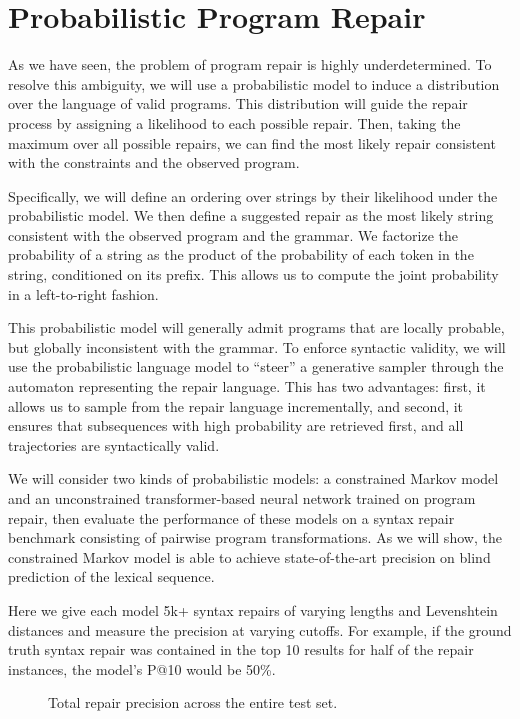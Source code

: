 \chapter{\rm\bfseries Probabilistic Program Repair}
\label{ch:chapter03}

As we have seen, the problem of program repair is highly underdetermined. To resolve this ambiguity, we will use a probabilistic model to induce a distribution over the language of valid programs. This distribution will guide the repair process by assigning a likelihood to each possible repair. Then, taking the maximum over all possible repairs, we can find the most likely repair consistent with the constraints and the observed program.

Specifically, we will define an ordering over strings by their likelihood under the probabilistic model. We then define a suggested repair as the most likely string consistent with the observed program and the grammar. We factorize the probability of a string as the product of the probability of each token in the string, conditioned on its prefix. This allows us to compute the joint probability in a left-to-right fashion.

This probabilistic model will generally admit programs that are locally probable, but globally inconsistent with the grammar. To enforce syntactic validity, we will use the probabilistic language model to ``steer'' a generative sampler through the automaton representing the repair language. This has two advantages: first, it allows us to sample from the repair language incrementally, and second, it ensures that subsequences with high probability are retrieved first, and all trajectories are syntactically valid.

We will consider two kinds of probabilistic models: a constrained Markov model and an unconstrained transformer-based neural network trained on program repair, then evaluate the performance of these models on a syntax repair benchmark consisting of pairwise program transformations. As we will show, the constrained Markov model is able to achieve state-of-the-art precision on blind prediction of the lexical sequence.

Here we give each model 5k+ syntax repairs of varying lengths and Levenshtein distances and measure the precision at varying cutoffs. For example, if the ground truth syntax repair was contained in the top 10 results for half of the repair instances, the model's P@10 would be 50\%.

\begin{figure}[H]
  \resizebox{.24\textwidth}{!}{}
  \resizebox{.24\textwidth}{!}{}
  \resizebox{.24\textwidth}{!}{}
  \resizebox{.24\textwidth}{!}{}
  \caption{Total repair precision across the entire test set.}
\end{figure}

